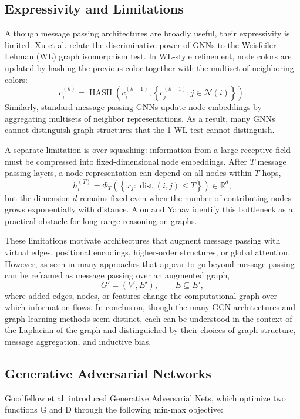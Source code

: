 \documentclass[11pt]{article}
\begin{document}
\subsection{Expressivity and Limitations}
Although message passing architectures are broadly useful, their expressivity is limited. 
Xu et al. \cite{xu2019powerful} relate the discriminative power of GNNs to the Weisfeiler--Lehman (WL) graph isomorphism test. 
In WL-style refinement, node colors are updated by hashing the previous color together with the multiset of neighboring colors:
\[
    c_i^{(k)}
    = \operatorname{HASH}\!\left(
        c_i^{(k-1)},
        \left\{c_j^{(k-1)} : j\in\mathcal{N}(i)\right\}
      \right).
\]
Similarly, standard message passing GNNs update node embeddings by aggregating multisets of neighbor representations. As a result, many GNNs cannot distinguish graph structures that the 1-WL test cannot distinguish.

A separate limitation is over-squashing: information from a large receptive field must be compressed into fixed-dimensional node embeddings. After $T$ message passing layers, a node representation can depend on all nodes within $T$ hops,
\[
    h_i^{(T)}
    = \Phi_T\!\left(\left\{x_j : \operatorname{dist}(i,j)\leq T\right\}\right)
    \in \mathbb{R}^d,
\]
but the dimension $d$ remains fixed even when the number of contributing nodes grows exponentially with distance. Alon and Yahav \cite{alon2021bottleneck} identify this bottleneck as a practical obstacle for long-range reasoning on graphs.

These limitations motivate architectures that augment message passing with virtual edges, positional encodings, higher-order structures, or global attention.
However, as seen in \cite{velickovic2022message} many approaches that appear to go beyond message passing can be reframed as message passing over an augmented graph,
\[
    G' = (V',E'),
    \qquad
    E \subseteq E',
\]
where added edges, nodes, or features change the computational graph over which information flows.
In conclusion, though the many GCN architectures and graph learning methods seem distinct, each can be understood in the context of the Laplacian of the graph and distinguiched by their choices of graph structure, message aggregation, and inductive bias.


\subsection{Generative Adversarial Networks}
Goodfellow et al. introduced Generative Adversarial Nets, which optimize two functions G and D through the following min-max objective:
\end{document}
